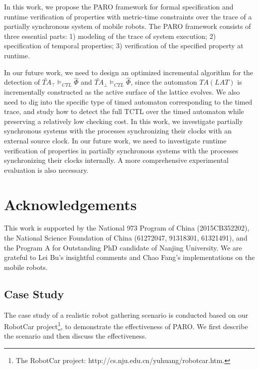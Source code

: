 \documentclass[10pt,conference,compsocconf,letterpaper]{IEEEtran}
\begin{document}
In this work, we propose the \textsf{PARO} framework for formal specification and runtime verification of properties with metric-time constraints over the trace of a partially synchronous system of mobile robots. The \textsf{PARO} framework consists of three essential parts: 1) modeling of the trace of system execution; 2) specification of temporal properties; 3) verification of the specified property at runtime.

In our future work, we need to design an optimized incremental algorithm for the detection of $\widetilde{TA}_\top\models_{CTL} \hat\Phi$ and $\widetilde{TA}_\bot\models_{CTL} \hat\Phi$, since the automaton $TA(LAT)$ is incrementally constructed as the active surface of the lattice evolves. We also need to dig into the specific type of timed automaton corresponding to the timed trace, and study how to detect the full TCTL over the timed automaton while preserving a relatively low checking cost. In this work, we investigate partially synchronous systems with the processes synchronizing their clocks with an external source clock. In our future work, we need to investigate runtime verification of properties in partially synchronous systems with the processes synchronizing their clocks internally. A more comprehensive experimental evaluation is also necessary.

\section*{Acknowledgements}

This work is supported by the National 973 Program of China (2015CB352202), the National Science Foundation of China (61272047, 91318301, 61321491), and the Program A for Outstanding PhD candidate of Nanjing University. We are grateful to Lei Bu's insightful comments and Chao Fang's implementations on the mobile robots.




\newpage
\appendix

\subsection{Case Study}\label{sec:Case Study}

The case study of a realistic robot gathering scenario is conducted based on our RobotCar project\footnote{The RobotCar project: http://cs.nju.edu.cn/yuhuang/robotcar.htm.}, to demonstrate the effectiveness of \textsf{PARO}. We first describe the scenario and then discuss the effectiveness.
\end{document}

